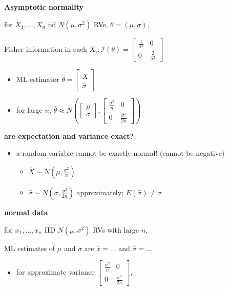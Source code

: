 \documentclass[10pt, landscape]{article}
\newcommand{\xbar}{\bar{x}}
\newcommand{\Xbar}{\bar{X}}
\newcommand{\seq}[2][n]{#2_1, \dots, #2_{#1}}
\begin{document}
\begin{multicols*}{4}
  \textbf{Asymptotic normality}

  for $\seq{X}$ iid $N(\mu, \sigma^2)$ RVs,  $\theta = (\mu, \sigma)$,

  Fisher information in each $X_i : \mathcal{I}(\theta) = 
  \begin{bmatrix}
    \frac{1}{\sigma^2} & 0 \\
    0 & \frac{2}{\sigma^2}
  \end{bmatrix}$

  \begin{itemize}
    \item ML estimator $\hat\theta = \begin{bmatrix} \Xbar \\ \hat\sigma \end{bmatrix}$
    \item for large $n$, $\hat\theta \approx N\left( 
        \begin{bmatrix} \mu \\ \sigma \end{bmatrix},
        \begin{bmatrix}
          \frac{\sigma^2}{n} & 0 \\
          0 & \frac{\sigma^2}{2n}
      \end{bmatrix} \right)$
  \end{itemize}

  \textbf{are expectation and variance exact?}

  \begin{itemize}
    \item a random variable cannot be exactly normal! (cannot be negative)
      \begin{itemize}
        \item $\Xbar \sim N(\mu, \frac{\sigma^2}{n})$
        \item $\hat\sigma \sim N(\sigma, \frac{\sigma^2}{2n})$ approximately; $E(\hat\sigma) \neq \sigma$
      \end{itemize}
  \end{itemize}

  \textbf{normal data}

  for $\seq x$ IID $N(\mu, \sigma^2)$ RVs with large $n$,

  ML estimates of  $\mu$ and $\sigma$ are $\xbar = \dots$ and  $\hat\sigma = \dots$

  \begin{itemize}
    \item for approximate variance 
      $\begin{bmatrix}
        \frac{\sigma^2}{n} & 0 \\
        0 & \frac{\sigma^2}{2n}
      \end{bmatrix}$, 


\end{itemize}
\end{multicols*}
\end{document}
